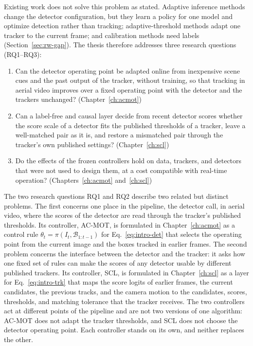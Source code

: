 Existing work does not solve this problem as stated. Adaptive inference methods change the detector configuration, but they learn a policy for one model and optimize detection rather than tracking; adaptive-threshold methods adapt one tracker to the current frame; and calibration methods need labels (Section~\ref{sec:rw-gap}). The thesis therefore addresses three research questions (RQ1--RQ3):
\begin{enumerate}
\item[\textbf{RQ1}] Can the detector operating point be adapted online from inexpensive scene cues and the past output of the tracker, without training, so that tracking in aerial video improves over a fixed operating point with the detector and the trackers unchanged? (Chapter~\ref{ch:acmot})
\item[\textbf{RQ2}] Can a label-free and causal layer decide from recent detector scores whether the score scale of a detector fits the published thresholds of a tracker, leave a well-matched pair as it is, and restore a mismatched pair through the tracker's own published settings? (Chapter~\ref{ch:scl})
\item[\textbf{RQ3}] Do the effects of the frozen controllers hold on data, trackers, and detectors that were not used to design them, at a cost compatible with real-time operation? (Chapters~\ref{ch:acmot} and~\ref{ch:scl})
\end{enumerate}

The two research questions RQ1 and RQ2 describe two related but distinct problems. The first concerns one place in the pipeline, the detector call, in aerial video, where the scores of the detector are read through the tracker's published thresholds. Its controller, AC-MOT, is formulated in Chapter~\ref{ch:acmot} as a control rule $\theta_t=\pi(I_t,\mathcal{B}_{1:t-1})$ for Eq.~\eqref{eq:intro-det} that selects the operating point from the current image and the boxes tracked in earlier frames. The second problem concerns the interface between the detector and the tracker: it asks how one fixed set of rules can make the scores of any detector usable by different published trackers. Its controller, SCL, is formulated in Chapter~\ref{ch:scl} as a layer for Eq.~\eqref{eq:intro-trk} that maps the score logits of earlier frames, the current candidates, the previous tracks, and the camera motion to the candidates, scores, thresholds, and matching tolerance that the tracker receives. The two controllers act at different points of the pipeline and are not two versions of one algorithm: AC-MOT does not adapt the tracker thresholds, and SCL does not choose the detector operating point. Each controller stands on its own, and neither replaces the other.

